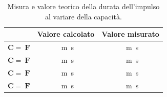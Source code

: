\documentclass{report}
\begin{document}
\begin{table}[h!]
	\centering
	\begin{tabular}{|c|c|c|}
		\cline{2-3} 
		\multicolumn{1}{c|}{} & \textbf{Valore calcolato} & \textbf{Valore misurato}\\ 
		\hline
		$\mathbf{C = \SI{}{\farad}}$ & \SI{}{m\second} & \SI{}{m\second} \\ 
		\hline
		$\mathbf{C = \SI{}{\farad}}$ & \SI{}{m\second} & \SI{}{m\second} \\ 
		\hline
		$\mathbf{C = \SI{}{\farad}}$ & \SI{}{m\second} & \SI{}{m\second} \\ 
		\hline
		$\mathbf{C = \SI{}{\farad}}$ & \SI{}{m\second} & \SI{}{m\second} \\ 
		\hline
	\end{tabular}
	\caption{Misura e valore teorico della durata dell'impulso al variare della capacità.}
	\label{table:impulsoCvar}
\end{table}

\end{document}
